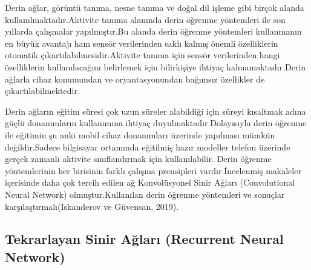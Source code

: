 \documentclass[12pt,twoside]{deuthesis}
\begin{document}
Derin ağlar, görüntü tanıma, nesne tanıma ve doğal dil işleme gibi birçok alanda kullanılmaktadır.Aktivite tanıma alanında derin öğrenme yöntemleri ile son yıllarda çalışmalar yapılmıştır.Bu alanda derin öğrenme yöntemleri kullanmanın en büyük avantajı ham sensör verilerinden saklı kalmış önemli özelliklerin otomatik çıkartılabilmesidir.Aktivite tanıma için sensör verilerinden hangi özelliklerin kullanılacağını belirlemek için bilirkişiye ihtiyaç kalmamaktadır.Derin ağlarla cihaz konumundan ve oryantasyonundan bağımsız özellikler de çıkartılabilmektedir.

Derin ağların eğitim süresi çok uzun süreler alabildiği için süreyi kısaltmak adına güçlü donanımların kullanımına ihtiyaç duyulmaktadır.Dolayısıyla derin öğrenme ile eğitimin şu anki mobil cihaz donanımları üzerinde yapılması mümkün değildir.Sadece bilgisayar ortamında eğitilmiş hazır modeller telefon üzerinde gerçek zamanlı aktivite sınıflandırmak için kullanılabilir.
Derin öğrenme yöntemlerinin her birisinin farklı çalışma prensipleri vardır.İncelenmiş makaleler içerisinde daha çok tercih edilen ağ Konvolüsyonel Sinir Ağları (Convolutional Neural Network) olmuştur.Kullanılan derin öğrenme yöntemleri ve sonuçlar karşılaştırmalı(Iskanderov ve Güvensan, 2019).

\hypertarget{tekrarlayan-sinir-aux11flarux131-recurrent-neural-network}{%
\subsection{Tekrarlayan Sinir Ağları (Recurrent Neural Network)}\label{tekrarlayan-sinir-aux11flarux131-recurrent-neural-network}}
\end{document}
